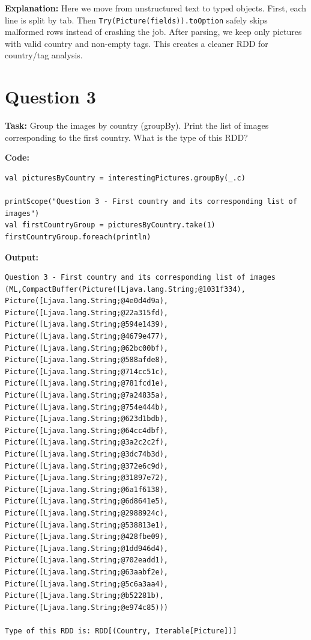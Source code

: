 \documentclass[11pt]{article}
\begin{document}
\textbf{Explanation:} Here we move from unstructured text to typed objects. First, each line is split by tab. Then \texttt{Try(Picture(fields)).toOption} safely skips malformed rows instead of crashing the job. After parsing, we keep only pictures with valid country and non-empty tags. This creates a cleaner RDD for country/tag analysis.

\section*{Question 3}
\textbf{Task:} Group the images by country (groupBy). Print the list of images corresponding to the first country. What is the type of this RDD?

\textbf{Code:}
\begin{lstlisting}
val picturesByCountry = interestingPictures.groupBy(_.c)

printScope("Question 3 - First country and its corresponding list of images")
val firstCountryGroup = picturesByCountry.take(1)
firstCountryGroup.foreach(println)
\end{lstlisting}

\textbf{Output:}
\begin{lstlisting}
Question 3 - First country and its corresponding list of images
(ML,CompactBuffer(Picture([Ljava.lang.String;@1031f334), Picture([Ljava.lang.String;@4e0d4d9a), Picture([Ljava.lang.String;@22a315fd), Picture([Ljava.lang.String;@594e1439), Picture([Ljava.lang.String;@4679e477), Picture([Ljava.lang.String;@62bc00bf), Picture([Ljava.lang.String;@588afde8), Picture([Ljava.lang.String;@714cc51c), Picture([Ljava.lang.String;@781fcd1e), Picture([Ljava.lang.String;@7a24835a), Picture([Ljava.lang.String;@754e444b), Picture([Ljava.lang.String;@623d1bdb), Picture([Ljava.lang.String;@64cc4dbf), Picture([Ljava.lang.String;@3a2c2c2f), Picture([Ljava.lang.String;@3dc74b3d), Picture([Ljava.lang.String;@372e6c9d), Picture([Ljava.lang.String;@31897e72), Picture([Ljava.lang.String;@6a1f6138), Picture([Ljava.lang.String;@6d8641e5), Picture([Ljava.lang.String;@2988924c), Picture([Ljava.lang.String;@538813e1), Picture([Ljava.lang.String;@428fbe09), Picture([Ljava.lang.String;@1dd946d4), Picture([Ljava.lang.String;@702eadd1), Picture([Ljava.lang.String;@63aabf2e), Picture([Ljava.lang.String;@5c6a3aa4), Picture([Ljava.lang.String;@b52281b), Picture([Ljava.lang.String;@e974c85)))

Type of this RDD is: RDD[(Country, Iterable[Picture])]
\end{lstlisting}
\end{document}
